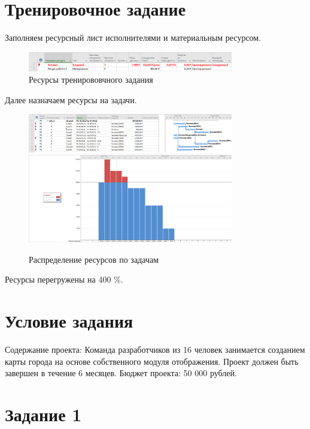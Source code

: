 \section{Тренировочное задание}

Заполняем ресурсный лист исполнителями и материальным ресурсом.

\begin{figure}[H]
	\centering
	\includegraphics[width=0.8\textwidth]{img/content/resources_0.png}
	\caption{Ресурсы тренирововчного задания}
\end{figure}

Далее назначаем ресурсы на задачи.

\begin{figure}[H]
	\centering
	\includegraphics[width=0.8\textwidth]{img/content/resources_tasks_0.png}
	\includegraphics[width=0.8\textwidth]{img/content/graph_recourses_0.png}
	\caption{Распределение ресурсов по задачам}
\end{figure}

Ресурсы перегружены на 400 \%.

\section{Условие задания}

Содержание проекта: Команда разработчиков из 16 человек занимается созданием карты города на основе собственного модуля отображения. Проект должен быть завершен в течение 6 месяцев. Бюджет проекта: 50 000 рублей.

\section{Задание 1}

